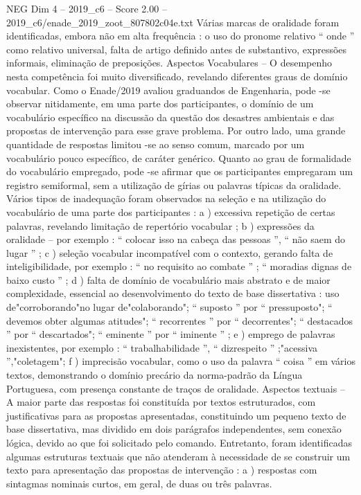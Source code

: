 \begin{textsample}{NEG Dim 4 – 2019\_c6 – Score 2.00 – 2019\_c6/enade\_2019\_zoot\_807802c04e.txt}
Várias marcas de oralidade foram identificadas, embora não em alta frequência : o uso do pronome relativo “ onde ” como relativo universal, falta de artigo definido antes de substantivo, expressões informais, eliminação de preposições.
Aspectos Vocabulares – O desempenho nesta competência foi muito diversificado, revelando diferentes graus de domínio vocabular.
Como o Enade/2019 avaliou graduandos de Engenharia, pode -se observar nitidamente, em uma parte dos participantes, o domínio de um vocabulário específico na discussão da questão dos desastres ambientais e das propostas de intervenção para esse grave problema.
Por outro lado, uma grande quantidade de respostas limitou -se ao senso comum, marcado por um vocabulário pouco específico, de caráter genérico.
Quanto ao grau de formalidade do vocabulário empregado, pode -se afirmar que os participantes empregaram um registro semiformal, sem a utilização de gírias ou palavras típicas da oralidade.
Vários tipos de inadequação foram observados na seleção e na utilização do vocabulário de uma parte dos participantes : a ) excessiva repetição de certas palavras, revelando limitação de repertório vocabular ; b ) expressões da oralidade – por exemplo : “ colocar isso na cabeça das pessoas ”, “ não saem do lugar ” ; c ) seleção vocabular incompatível com o contexto, gerando falta de inteligibilidade, por exemplo : “ no requisito ao combate ” ; “ moradias dignas de baixo custo ” ; d ) falta de domínio de vocabulário mais abstrato e de maior complexidade, essencial ao desenvolvimento do texto de base dissertativa : uso de"corroborando"no lugar de"colaborando"; “ suposto ” por “ pressuposto"; “ devemos obter algumas atitudes"; “ recorrentes ” por “ decorrentes"; “ destacados ” por “ descartados"; “ eminente ” por “ iminente ” ; e ) emprego de palavras inexistentes, por exemplo : “ trabalhabilidade ”, “ dizrespeito ” ;"acessiva ”,"coletagem"; f ) imprecisão vocabular, como o uso da palavra “ coisa ” em vários textos, demonstrando o domínio precário da norma-padrão da Língua Portuguesa, com presença constante de traços de oralidade.
Aspectos textuais – A maior parte das respostas foi constituída por textos estruturados, com justificativas para as propostas apresentadas, constituindo um pequeno texto de base dissertativa, mas dividido em dois parágrafos independentes, sem conexão lógica, devido ao que foi solicitado pelo comando.
Entretanto, foram identificadas algumas estruturas textuais que não atenderam à necessidade de se construir um texto para apresentação das propostas de intervenção : a ) respostas com sintagmas nominais curtos, em geral, de duas ou três palavras.

\end{textsample}
